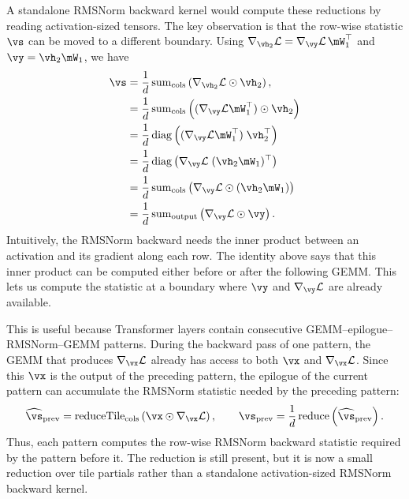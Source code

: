 A standalone RMSNorm backward kernel would compute these reductions by reading activation-sized tensors. The key observation is that the row-wise statistic $\vs$ can be moved to a different boundary. Using $\nabla_{\vh_2}\mathcal{L} = \nabla_{\vy}\mathcal{L} \, \mW_1^\top$ and
$\vy = \vh_2 \mW_1$, we have
\begin{align*}
\vs
&=
\frac{1}{d}
\operatorname{sum}_{\mathrm{cols}}
\left(
\nabla_{\vh_2}\mathcal{L} \odot \vh_2
\right), \\
&=
\frac{1}{d}
\operatorname{sum}_{\mathrm{cols}}
\left(
(\nabla_{\vy}\mathcal{L}\mW_1^\top) \odot \vh_2
\right) \\
&=
\frac{1}{d}
\operatorname{diag}
\left(
(\nabla_{\vy}\mathcal{L}\mW_1^\top) \; \vh_2^\top
\right) \\
&=
\frac{1}{d}
\operatorname{diag}
\left(
\nabla_{\vy}\mathcal{L} \; (\vh_2 \mW_1)^\top
\right) \\
&=
\frac{1}{d}
\operatorname{sum}_{\mathrm{cols}}
\left(
\nabla_{\vy}\mathcal{L} \odot (\vh_2 \mW_1)
\right) \\
&=
\frac{1}{d}
\operatorname{sum}_{\mathrm{output}}
\left(
\nabla_{\vy}\mathcal{L} \odot \vy
\right).
\end{align*}
Intuitively, the RMSNorm backward needs the inner product between an activation and its gradient along each row. The identity above says that this inner product can be computed either before or after the following GEMM. This lets us compute the statistic at a boundary where $\vy$ and $\nabla_{\vy}\mathcal{L}$ are already available.

This is useful because Transformer layers contain consecutive GEMM--epilogue--RMSNorm--GEMM patterns. During the backward pass of one pattern, the GEMM that produces $\nabla_{\vx}\mathcal{L}$ already has access to both $\vx$ and $\nabla_{\vx}\mathcal{L}$. Since this $\vx$ is the output of the preceding pattern, the epilogue of the current pattern can accumulate the RMSNorm statistic needed by the preceding pattern:
\begin{align*}
\widehat{\vs}_{\mathrm{prev}}
=
\operatorname{reduceTile}_{\mathrm{cols}}
\left(
\vx \odot \nabla_{\vx}\mathcal{L}
\right),
\qquad
\vs_{\mathrm{prev}}
=
\frac{1}{d}
\operatorname{reduce}
\left(
\widehat{\vs}_{\mathrm{prev}}
\right).
\end{align*}
Thus, each pattern computes the row-wise RMSNorm backward statistic required by the pattern before it. The reduction is still present, but it is now a small reduction over tile partials rather than a standalone activation-sized RMSNorm backward kernel.

